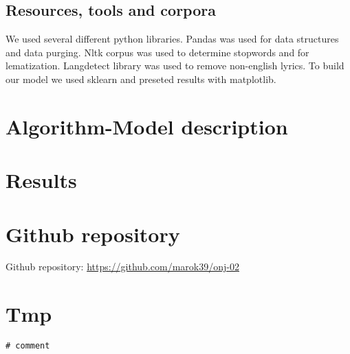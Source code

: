 \documentclass[a4paper,11pt]{article}
\begin{document}
\subsection{Resources, tools and corpora}

We used several different python libraries. Pandas was used for data structures and data purging. Nltk corpus was used to determine stopwords and for lematization. Langdetect library was used to remove non-english lyrics. To build our model we used sklearn and preseted results with matplotlib.

\section{Algorithm-Model description}


\section{Results}

\section{Github repository}
Github repository: \href{https://github.com/marok39/onj-02}{https://github.com/marok39/onj-02}


\pagebreak
\appendix
\appendixpage
\section{\label{label-tmp} Tmp}
\begin{lstlisting}
# comment
\end{lstlisting}
\end{document}
